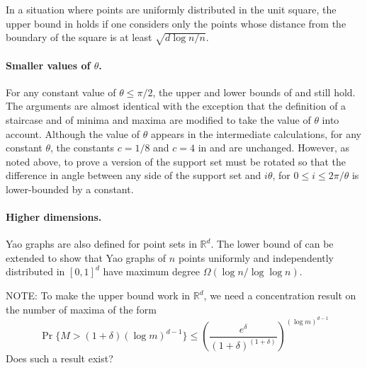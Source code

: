 \documentclass[lotsofwhite,charterfonts]{patmorin}
\newcommand{\RR}{\mathbb{R}}
\begin{document}
In a situation where points are uniformly distributed in the unit square,
the upper bound in  holds if one considers only
the points whose distance from the boundary of the square is at least
$\sqrt{d\log n/n}$.

\paragraph{Smaller values of $\theta$.}
For any constant value of $\theta \le \pi /2$, the upper and lower bounds
of  and 
still hold.  The arguments are almost identical with the exception that
the definition of a staircase and of minima and maxima are modified to
take the value of $\theta$ into account.  Although the value of $\theta$
appears in the intermediate calculations, for any constant $\theta$,
the constants $c=1/8$ and $c=4$ in 
and  are unchanged.  However, as noted above,
to prove a version of  the support set
must be rotated so that the difference in angle between any side of the
support set and $i\theta$, for $0\le i\le 2\pi/\theta$ is lower-bounded
by a constant.


\paragraph{Higher dimensions.}  
Yao graphs are also defined for point sets in $\RR^d$.  The lower bound of
 can be extended to show that Yao graphs
of $n$ points uniformly and independently distributed in $[0,1]^d$ have
maximum degree $\Omega(\log n/\log\log n)$.  

NOTE: To make the upper bound work in $\RR^d$, we need a concentration
result on the number of maxima of the form
\[
\Pr\{M > (1+\delta)(\log m)^{d-1}\} \le
   \left(\frac{e^\delta}{(1+\delta)^{(1+\delta)}}\right)^{(\log m)^{d-1}}
\]
Does such a result exist?




\nocite{*}

\end{document}
